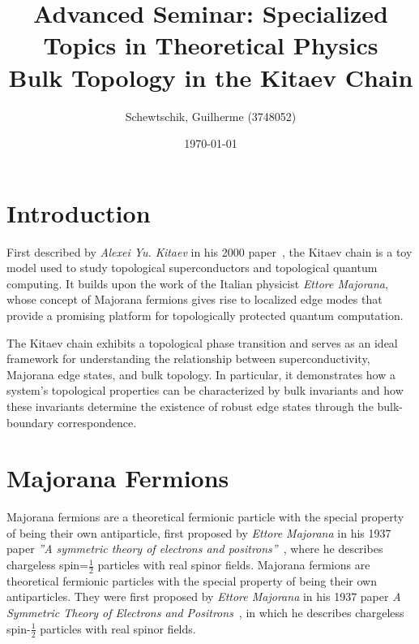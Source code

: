 \documentclass[11pt, a4paper]{article}
\title{Advanced Seminar: Specialized Topics in Theoretical Physics \\[1ex] \large \textbf{Bulk Topology in the Kitaev Chain}}
\author{Schewtschik, Guilherme (3748052)}
\date{\today}
\numberwithin{equation}{section}
\begin{document}
\maketitle



\section{Introduction}

First described by \textit{Alexei Yu. Kitaev} in his 2000 paper~\cite{Kitaev2000}, the Kitaev chain is a toy model used to study topological superconductors and topological quantum computing. It builds upon the work of the Italian physicist \textit{Ettore Majorana}, whose concept of Majorana fermions gives rise to localized edge modes that provide a promising platform for topologically protected quantum computation.

The Kitaev chain exhibits a topological phase transition and serves as an ideal framework for understanding the relationship between superconductivity, Majorana edge states, and bulk topology. In particular, it demonstrates how a system's topological properties can be characterized by bulk invariants and how these invariants determine the existence of robust edge states through the bulk-boundary correspondence.



\section{Majorana Fermions}\label{sec:Majorana}
\aicorrection
{Majorana fermions are a theoretical fermionic particle with the special property of being their own antiparticle, first proposed by \textit{Ettore Majorana} in his 1937 paper \textit{''A symmetric theory of electrons and positrons''}~\cite{Majorana1937}, where he describes chargeless spin=$\frac{1}{2}$ particles with real spinor fields.}
{Majorana fermions are theoretical fermionic particles with the special property of being their own antiparticles. They were first proposed by \textit{Ettore Majorana} in his 1937 paper \textit{A Symmetric Theory of Electrons and Positrons}~\cite{Majorana1937}, in which he describes chargeless spin-$\frac{1}{2}$ particles with real spinor fields.}
\end{document}
